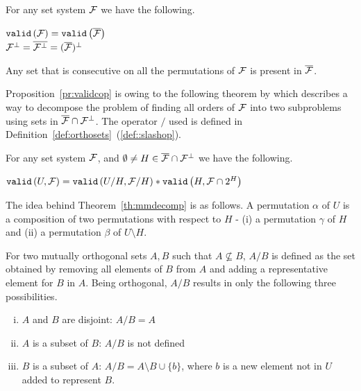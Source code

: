 
\begin{theoremsansproof}[{\cite[Th.~3,6]{mm96}}]
  \label{th:validcop}
  For any set system ${\cal F}$ we have the following. \par
  \centering
    ${\tt valid}\left({\cal F}\right) = {\tt valid}\left(\overline{{\cal F}}\right)$ \\
    ${\cal F}^{\bot} = \overline{{\cal F}^{\bot}} = (\overline{{\cal F}})^{\bot}$
\end{theoremsansproof}

\begin{proposition}
  \label{pr:validcop}
  Any set that is consecutive on all the \COP permutations of ${\cal F}$ is
  present in $\overline{{\cal F}}$.
\end{proposition}

Proposition~\ref{pr:validcop} is owing to the following theorem by
which \cite{mm96} describes a way to decompose the problem of finding
all \COP orders of ${\cal F}$ into two subproblems using sets in
$\overline{{\cal F}} \cap {\cal F}^{\bot}$. The operator $/$ used is defined in
Definition~\ref{def:orthosets}~(\ref{def::slashop}).

\begin{theoremsansproof}[{\cite[Th.~7]{mm96}}]
  \label{th:mmdecomp}
  For any set system ${\cal F}$, and $\emptyset \ne H \in \overline{{\cal F}}
  \cap {\cal F}^{\bot}$ we have the following.\par
  \centering
  ${\tt valid}\left(U,{\cal F}\right) = {\tt valid}\left(U/H,{\cal F}/H\right) * {\tt valid}\left(H,{\cal F} \cap 2^H\right)$
\end{theoremsansproof}


\def \ff {\overline{\cF} \cap \cF^{\bot}}
The idea behind Theorem~\ref{th:mmdecomp} is as follows. A permutation $\alpha$
of $U$ is a composition of two permutations with respect to $H$ - (i) a
permutation $\gamma$ of $H$ and (ii) a permutation $\beta$ of $U
\setminus H$.

For two mutually orthogonal sets $A, B$ such that $A \nsubseteq B$,
$A/B$ is defined as the set obtained by removing all elements of $B$
from $A$ and adding a representative element for $B$ in $A$. Being orthogonal,
$A/B$ results in only the following three possibilities.
\begin{enumerate}[i. ]
\item $A$ and $ B$ are disjoint: $A/B  = A$
\item $A$ is a subset of $B$: $A/B$ is not defined
\item $B$ is a subset of $A$: $A/B = A \setminus B \cup \{b\}$, where $b$
is a new element not in $U$ added to represent $B$.
\end{enumerate}

